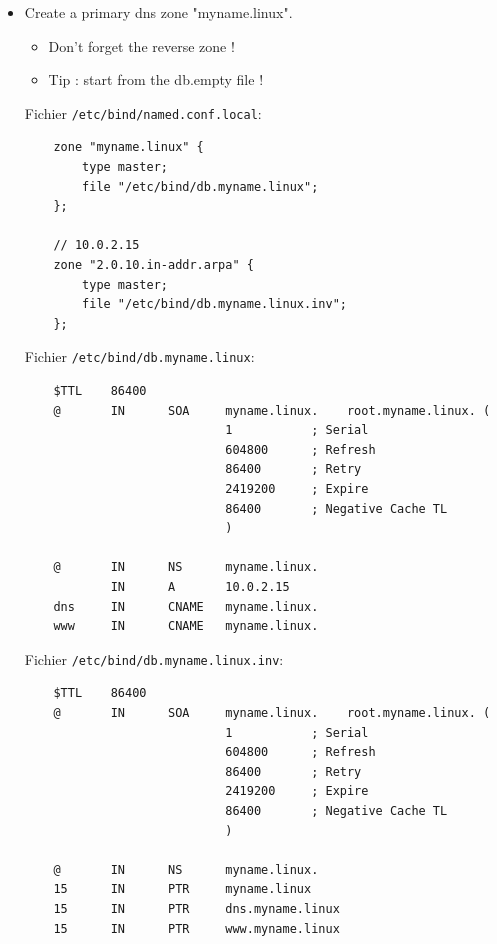 \documentclass[a4paper]{article}
\begin{document}
\begin{itemize}
\item Create a primary dns zone "myname.linux".
\begin{itemize}
    \item Don't forget the reverse zone !
    \item Tip : start from the db.empty file !
\end{itemize}
\begin{example}

Fichier \texttt{/etc/bind/named.conf.local}:
\begin{verbatim}
    zone "myname.linux" {
        type master;
        file "/etc/bind/db.myname.linux";
    };

    // 10.0.2.15
    zone "2.0.10.in-addr.arpa" {
        type master;
        file "/etc/bind/db.myname.linux.inv";
    };
\end{verbatim}

Fichier \texttt{/etc/bind/db.myname.linux}:
\begin{verbatim}
    $TTL    86400
    @       IN      SOA     myname.linux.    root.myname.linux. (
                            1           ; Serial
                            604800      ; Refresh
                            86400       ; Retry
                            2419200     ; Expire
                            86400       ; Negative Cache TL
                            )

    @       IN      NS      myname.linux.
            IN      A       10.0.2.15
    dns     IN      CNAME   myname.linux.
    www     IN      CNAME   myname.linux.
\end{verbatim}

Fichier \texttt{/etc/bind/db.myname.linux.inv}:
\begin{verbatim}
    $TTL    86400
    @       IN      SOA     myname.linux.    root.myname.linux. (
                            1           ; Serial
                            604800      ; Refresh
                            86400       ; Retry
                            2419200     ; Expire
                            86400       ; Negative Cache TL
                            )

    @       IN      NS      myname.linux.
    15      IN      PTR     myname.linux
    15      IN      PTR     dns.myname.linux
    15      IN      PTR     www.myname.linux
\end{verbatim}


\end{example}
\end{itemize}
\end{document}
